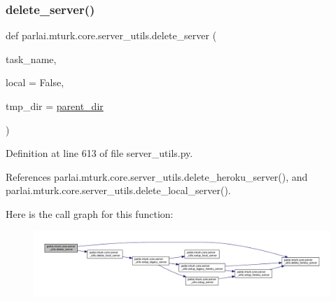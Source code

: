 \subsubsection{\texorpdfstring{delete\+\_\+server()}{delete\_server()}}
{\footnotesize\ttfamily def parlai.\+mturk.\+core.\+server\+\_\+utils.\+delete\+\_\+server (\begin{DoxyParamCaption}\item[{}]{task\+\_\+name,  }\item[{}]{local = {\ttfamily False},  }\item[{}]{tmp\+\_\+dir = {\ttfamily \hyperlink{namespaceparlai_1_1mturk_1_1core_1_1server__utils_a193439bdbc25a32b00f1a43e6f8532d8}{parent\+\_\+dir}} }\end{DoxyParamCaption})}



Definition at line 613 of file server\+\_\+utils.\+py.



References parlai.\+mturk.\+core.\+server\+\_\+utils.\+delete\+\_\+heroku\+\_\+server(), and parlai.\+mturk.\+core.\+server\+\_\+utils.\+delete\+\_\+local\+\_\+server().

Here is the call graph for this function\+:
\nopagebreak
\begin{figure}[H]
\begin{center}
\leavevmode
\includegraphics[width=350pt]{namespaceparlai_1_1mturk_1_1core_1_1server__utils_a3c7c1d82bd4d26eb98ce9711de3cca7c_cgraph}
\end{center}
\end{figure}
\mbox{\label{namespaceparlai_1_1mturk_1_1core_1_1server__utils_af1c97e9b93a403e200ac75b87a51c3c1}} 
